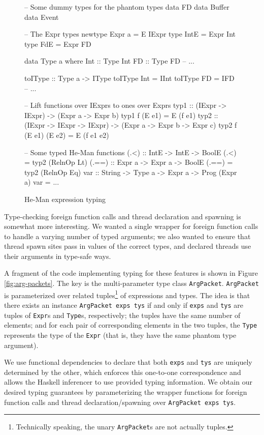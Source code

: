 \documentclass[preprint]{sigplanconf}
\renewcommand{\t}{\texttt}
\begin{document}
\begin{figure}[ht]
\centering
\begin{code}
-- Some dummy types for the phantom types
data FD
data Buffer
data Event

-- The Expr types
newtype Expr a = E IExpr
type IntE = Expr Int
type FdE = Expr FD

data Type a where
  Int :: Type Int
  FD :: Type FD
  -- ...

toIType :: Type a -> IType
toIType Int = IInt
toIType FD = IFD
-- ...

-- Lift functions over IExprs to ones over Exprs
typ1 :: (IExpr -> IExpr) -> (Expr a -> Expr b)
typ1 f (E e1) = E (f e1)
typ2 :: (IExpr -> IExpr -> IExpr) ->
        (Expr a -> Expr b -> Expr c)
typ2 f (E e1) (E e2) = E (f e1 e2)

-- Some typed He-Man functions
(.<) :: IntE -> IntE -> BoolE
(.<) = typ2 (RelnOp Lt)
(.==) :: Expr a -> Expr a -> BoolE
(.==) = typ2 (RelnOp Eq)
var :: String -> Type a -> Expr a -> Prog (Expr a)
var = ...
\end{code}
\caption{He-Man expression typing} %
\label{fig:types}
\end{figure}

Type-checking foreign function calls and thread declaration and spawning is
somewhat more interesting. We wanted a single wrapper for foreign function calls
to handle a varying number of typed arguments; we also wanted to ensure that
thread spawn sites pass in values of the correct types, and declared threads use
their arguments in type-safe ways.

A fragment of the code implementing typing for these features is shown
in Figure \ref{fig:arg-packets}. The key is the multi-parameter type
class \t{ArgPacket}. \t{ArgPacket} is parameterized over related
tuples\footnote{Technically speaking, the unary \t{ArgPacket}s are
not actually tuples.} of expressions and types. The idea is that
there exists an instance \t{ArgPacket exps tys} if and only if
\t{exps} and \t{tys} are tuples of \t{Expr}s and \t{Type}s,
respectively; the tuples have the same number of elements; and for
each pair of corresponding elements in the two tuples, the \t{Type}
represents the type of the \t{Expr} (that is, they have the same
phantom type argument).

We use functional dependencies to declare that both \t{exps} and \t{tys} are
uniquely determined by the other, which enforces this one-to-one correspondence
and allows the Haskell inferencer to use provided typing information. We obtain
our desired typing guarantees by parameterizing the wrapper functions for
foreign function calls and thread declaration/spawning over \t{ArgPacket exps tys}.
\end{document}
